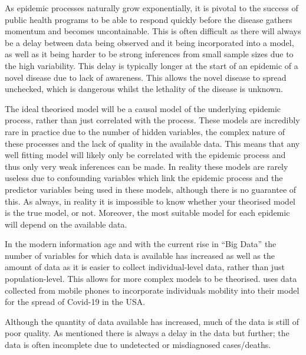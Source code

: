 \documentclass[11pt,a4paper]{article}
\theoremstyle{break}
\begin{document}
  \par As epidemic processes naturally grow exponentially, it is pivotal to the success of public health programs to be able to respond quickly before the disease gathers momentum and becomes uncontainable. This is often difficult as there will always be a delay between data being observed and it being incorporated into a model, as well as it being harder to be strong inferences from small sample sizes due to the high variability. This delay is typically longer at the start of an epidemic of a novel disease due to lack of awareness. This allows the novel disease to spread unchecked, which is dangerous whilst the lethality of the disease is unknown.


  \par The ideal theorised model will be a causal model of the underlying epidemic process, rather than just correlated with the process. These models are incredibly rare in practice due to the number of hidden variables, the complex nature of these processes and the lack of quality in the available data. This means that any well fitting model will likely only be correlated with the epidemic process and thus only very weak inferences can be made. In reality these models are rarely useless due to confounding variables which link the epidemic process and the predictor variables being used in these models, although there is no guarantee of this. As always, in reality it is impossible to know whether your theorised model is the true model, or not. Moreover, the most suitable model for each epidemic will depend on the available data.

  \par In the modern information age and with the current rise in ``Big Data'' the number of variables for which data is available has increased as well as the amount of data as it is easier to collect individual-level data, rather than just population-level. This allows for more complex models to be theorised.  \cite[]{association_between_mobility_patterns_and_covid_19_transmission_in_the_usa} uses data collected from mobile phones to incorporate individuals mobility into their model for the spread of Covid-19 in the USA.

  \par Although the quantity of data available has increased, much of the data is still of poor quality. As mentioned there is always a delay in the data but further; the data is often incomplete due to undetected or misdiagnosed cases/deaths.
\end{document}
